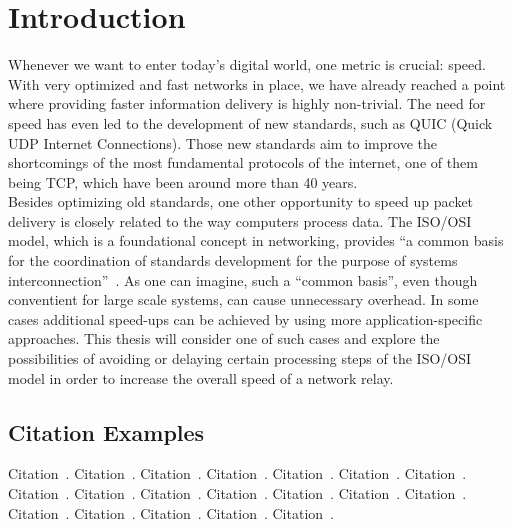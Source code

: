 
\chapter{Introduction}\label{chapter:introduction}

Whenever we want to enter today's digital world, one metric is crucial: speed.
With very optimized and fast networks in place, we have already reached a point where providing faster information
delivery is highly non-trivial.
The need for speed has even led to the development of new standards, such as QUIC (Quick UDP Internet Connections). 
Those new standards aim to improve the shortcomings of the most fundamental protocols of the internet, one of them
being TCP, which have been around more than 40 years. 
\\
Besides optimizing old standards, one other opportunity to speed up packet delivery is closely related to the way 
computers process data.
The ISO/OSI model, which is a foundational concept in networking, provides ``a common basis for the coordination 
of standards development for the purpose of systems interconnection''~\parencite{iso-osi-standard}.
As one can imagine, such a ``common basis'', even though conventient for large scale systems, can cause unnecessary
overhead.
In some cases additional speed-ups can be achieved by using more application-specific approaches.
This thesis will consider one of such cases and explore the possibilities of avoiding or delaying certain processing
steps of the ISO/OSI model in order to increase the overall speed of a network relay.







\section{Citation Examples}
Citation~\parencite{rfc-9000}.
Citation~\parencite{iso-osi-standard}.
Citation~\parencite{draft-moqtransport}.
Citation~\parencite{article-quic-usage}.
Citation~\parencite{internet-quic-usage}.
Citation~\parencite{facebook-quic-usage}.
Citation~\parencite{google-quic-usage}.
Citation~\parencite{quic-nic-offload}.
Citation~\parencite{quic-explained}.
Citation~\parencite{equic-gateway}.
Citation~\parencite{media-streaming-prio-drop}.
Citation~\parencite{quic-nic-offload-patent}.
Citation~\parencite{kernel-bypass-msc-thesis}.
Citation~\parencite{quic-go-repo}.
Citation~\parencite{quic-go-prio-packs-repo}.
Citation~\parencite{adaptive-moq-repo}.
Citation~\parencite{priority-moqtransport-repo}.
Citation~\parencite{fast-relays-thesis-repo}.
Citation~\parencite{ebpf-verifier}.